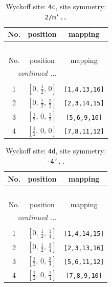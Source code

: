 \documentclass[fleqn,8pt]{jsarticle}
\begin{document}
\renewcommand{\arraystretch}{1.2}
\begin{longtable}{ccc}
\caption{Wyckoff site: {\tt 4c}, site symmetry: {\tt 2/m'..}}
 \\
 \hline \hline
No. & position & mapping \\ \hline \endfirsthead

\multicolumn{2}{l}{\tablename\ \thetable{}} \\
 \hline \hline
No. & position & mapping \\ \hline \endhead

 \hline \hline
\multicolumn{2}{r}{\footnotesize\it continued ...} \\ \endfoot

 \hline \hline
\multicolumn{2}{r}{} \\ \endlastfoot

1 & $\left[ 0,\, \frac{1}{2},\, 0 \right]$ & {\tt [1,4,13,16]} \\ \hline
2 & $\left[ 0,\, \frac{1}{2},\, \frac{1}{2} \right]$ & {\tt [2,3,14,15]} \\ \hline
3 & $\left[ \frac{1}{2},\, 0,\, \frac{1}{2} \right]$ & {\tt [5,6,9,10]} \\ \hline
4 & $\left[ \frac{1}{2},\, 0,\, 0 \right]$ & {\tt [7,8,11,12]} \\
\end{longtable}
\renewcommand{\arraystretch}{1.2}
\begin{longtable}{ccc}
\caption{Wyckoff site: {\tt 4d}, site symmetry: {\tt -4'..}}
 \\
 \hline \hline
No. & position & mapping \\ \hline \endfirsthead

\multicolumn{2}{l}{\tablename\ \thetable{}} \\
 \hline \hline
No. & position & mapping \\ \hline \endhead

 \hline \hline
\multicolumn{2}{r}{\footnotesize\it continued ...} \\ \endfoot

 \hline \hline
\multicolumn{2}{r}{} \\ \endlastfoot

1 & $\left[ 0,\, \frac{1}{2},\, \frac{1}{4} \right]$ & {\tt [1,4,14,15]} \\ \hline
2 & $\left[ 0,\, \frac{1}{2},\, \frac{3}{4} \right]$ & {\tt [2,3,13,16]} \\ \hline
3 & $\left[ \frac{1}{2},\, 0,\, \frac{3}{4} \right]$ & {\tt [5,6,11,12]} \\ \hline
4 & $\left[ \frac{1}{2},\, 0,\, \frac{1}{4} \right]$ & {\tt [7,8,9,10]} \\
\end{longtable}
\end{document}
